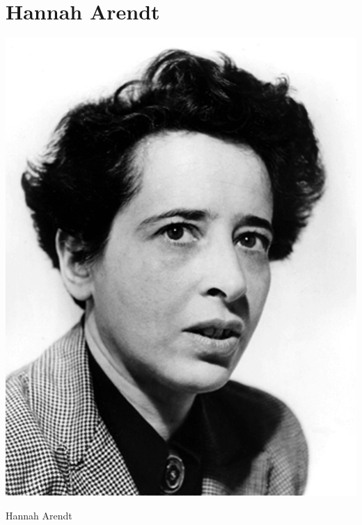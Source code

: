 \documentclass[12pt]{tufte-handout}
\begin{document}
\section{Hannah Arendt}
\begin{marginfigure}[20\baselineskip]%
\includegraphics[width=\linewidth]{graphics/hannah-arendt-political-philosopher.jpg}
  \caption{Hannah Arendt }
  \label{fig:HannahArendt}
\end{marginfigure}
\end{document}
